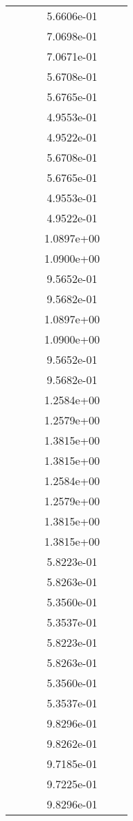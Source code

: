 \begin{xltabular}{\textwidth}{r|rS[table-format=1.3e+2]S[table-format=1.4e+2]S[table-format=1.4e+2]S[table-format=-1.5]}
&  &  & 5.6606e-01 & & \\
&  &  & 7.0698e-01 & & \\
&  &  & 7.0671e-01 & & \\
&  &  & 5.6708e-01 & & \\
&  &  & 5.6765e-01 & & \\
&  &  & 4.9553e-01 & & \\
&  &  & 4.9522e-01 & & \\
&  &  & 5.6708e-01 & & \\
&  &  & 5.6765e-01 & & \\
&  &  & 4.9553e-01 & & \\
&  &  & 4.9522e-01 & & \\
&  &  & 1.0897e+00 & & \\
&  &  & 1.0900e+00 & & \\
&  &  & 9.5652e-01 & & \\
&  &  & 9.5682e-01 & & \\
&  &  & 1.0897e+00 & & \\
&  &  & 1.0900e+00 & & \\
&  &  & 9.5652e-01 & & \\
&  &  & 9.5682e-01 & & \\
&  &  & 1.2584e+00 & & \\
&  &  & 1.2579e+00 & & \\
&  &  & 1.3815e+00 & & \\
&  &  & 1.3815e+00 & & \\
&  &  & 1.2584e+00 & & \\
&  &  & 1.2579e+00 & & \\
&  &  & 1.3815e+00 & & \\
&  &  & 1.3815e+00 & & \\
&  &  & 5.8223e-01 & & \\
&  &  & 5.8263e-01 & & \\
&  &  & 5.3560e-01 & & \\
&  &  & 5.3537e-01 & & \\
&  &  & 5.8223e-01 & & \\
&  &  & 5.8263e-01 & & \\
&  &  & 5.3560e-01 & & \\
&  &  & 5.3537e-01 & & \\
&  &  & 9.8296e-01 & & \\
&  &  & 9.8262e-01 & & \\
&  &  & 9.7185e-01 & & \\
&  &  & 9.7225e-01 & & \\
&  &  & 9.8296e-01 & & \\

\end{xltabular}
